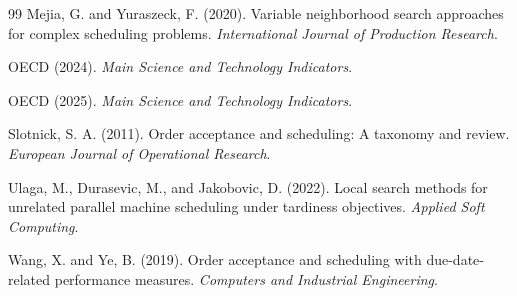 \documentclass[11pt]{article}
\begin{document}
{\begin{thebibliography}{99}
Mejia, G. and Yuraszeck, F. (2020).
Variable neighborhood search approaches for complex scheduling problems.
\emph{International Journal of Production Research}.

OECD (2024).
\emph{Main Science and Technology Indicators}.

OECD (2025).
\emph{Main Science and Technology Indicators}.

Slotnick, S. A. (2011).
Order acceptance and scheduling: A taxonomy and review.
\emph{European Journal of Operational Research}.

Ulaga, M., Durasevic, M., and Jakobovic, D. (2022).
Local search methods for unrelated parallel machine scheduling under tardiness objectives.
\emph{Applied Soft Computing}.

Wang, X. and Ye, B. (2019).
Order acceptance and scheduling with due-date-related performance measures.
\emph{Computers and Industrial Engineering}.
\end{thebibliography}
}
\end{document}
